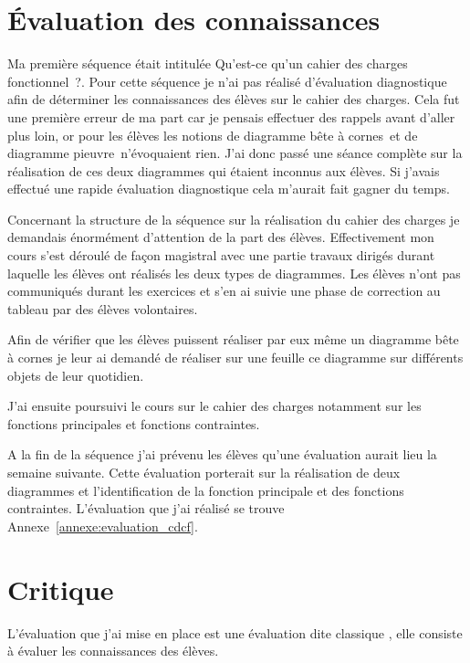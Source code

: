 
\section{Évaluation des connaissances}

Ma première séquence était intitulée \og Qu'est-ce qu'un cahier des charges fonctionnel~?\fg. 
Pour cette séquence je n'ai pas réalisé d'évaluation diagnostique afin de déterminer les connaissances des élèves sur le cahier des charges.
Cela fut une première erreur de ma part car je pensais effectuer des rappels avant d'aller plus loin, or pour les élèves les notions de \og diagramme bête à cornes\fg ~et de \og diagramme pieuvre\fg ~n'évoquaient rien.
J'ai donc passé une séance complète sur la réalisation de ces deux diagrammes qui étaient inconnus aux élèves.
Si j'avais effectué une rapide évaluation diagnostique cela m'aurait fait gagner du temps.

Concernant la structure de la séquence sur la réalisation du cahier des charges je demandais énormément d'attention de la part des élèves. 
Effectivement mon cours s'est déroulé de façon magistral avec une partie travaux dirigés durant laquelle les élèves ont réalisés les deux types de diagrammes.
Les élèves n'ont pas communiqués durant les exercices et s'en ai suivie une phase de correction au tableau par des élèves volontaires.

Afin de vérifier que les élèves puissent réaliser par eux même un diagramme bête à cornes je leur ai demandé de réaliser sur une feuille ce diagramme sur différents objets de leur quotidien.

J'ai ensuite poursuivi le cours sur le cahier des charges notamment sur les fonctions principales et fonctions contraintes.

A la fin de la séquence j'ai prévenu les élèves qu'une évaluation aurait lieu la semaine suivante.
Cette évaluation porterait sur la réalisation de deux diagrammes et l'identification de la fonction principale et des fonctions contraintes.
L'évaluation que j'ai réalisé se trouve Annexe~\ref{annexe:evaluation_cdcf}.

\section{Critique}

L'évaluation que j'ai mise en place est une évaluation dite \og classique \fg, elle consiste à évaluer les connaissances des élèves.

